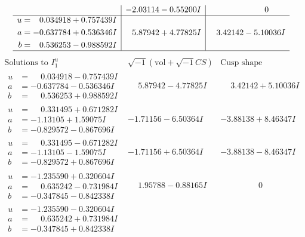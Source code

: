 \documentclass[1p]{elsarticle_modified}
\theoremstyle{definition}
\newcommand{\I}{\sqrt{-1}}
\begin{document}
$$\begin{array}{c|c|c}
 & -2.03114 - 0.55200 I & \phantom{-0.000000 } 0 \\ \hline\begin{aligned}
u &= \phantom{-}0.034918 + 0.757439 I \\
a &= -0.637784 + 0.536346 I \\
b &= \phantom{-}0.536253 - 0.988592 I\end{aligned}
 & \phantom{-}5.87942 + 4.77825 I & \phantom{-}3.42142 - 5.10036 I\\
 \hline 
 \end{array}$$\newpage$$\begin{array}{c|c|c}  
\text{Solutions to }I^u_{1}& \I (\text{vol} + \sqrt{-1}CS) & \text{Cusp shape}\\
 \hline 
\begin{aligned}
u &= \phantom{-}0.034918 - 0.757439 I \\
a &= -0.637784 - 0.536346 I \\
b &= \phantom{-}0.536253 + 0.988592 I\end{aligned}
 & \phantom{-}5.87942 - 4.77825 I & \phantom{-}3.42142 + 5.10036 I \\ \hline\begin{aligned}
u &= \phantom{-}0.331495 + 0.671282 I \\
a &= -1.13105 + 1.59075 I \\
b &= -0.829572 - 0.867696 I\end{aligned}
 & -1.71156 - 6.50364 I & -3.88138 + 8.46347 I \\ \hline\begin{aligned}
u &= \phantom{-}0.331495 - 0.671282 I \\
a &= -1.13105 - 1.59075 I \\
b &= -0.829572 + 0.867696 I\end{aligned}
 & -1.71156 + 6.50364 I & -3.88138 - 8.46347 I \\ \hline\begin{aligned}
u &= -1.235590 + 0.320604 I \\
a &= \phantom{-}0.635242 - 0.731984 I \\
b &= -0.347845 - 0.842338 I\end{aligned}
 & \phantom{-}1.95788 - 0.88165 I & \phantom{-0.000000 } 0 \\ \hline\begin{aligned}
u &= -1.235590 - 0.320604 I \\
a &= \phantom{-}0.635242 + 0.731984 I \\
b &= -0.347845 + 0.842338 I\end{aligned}

\end{array}$$
\end{document}
